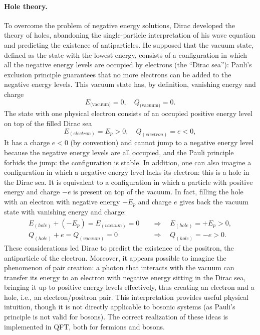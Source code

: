 \paragraph{Hole theory.}
To overcome the problem of negative energy solutions, Dirac developed the theory of holes, abandoning the single-particle interpretation of his wave equation and predicting the existence of antiparticles. He supposed that the vacuum state, defined as the state with the lowest energy, consists of a configuration in which all the negative energy levels are occupied by electrons (the “Dirac sea”): Pauli’s exclusion principle guarantees that no more electrons can be added to the negative energy levels. This vacuum state has, by definition, vanishing energy and charge
\[
    E_{\text{(vacuum)}} = 0, \quad Q_{\text{(vacuum)}} = 0.
\]
The state with one physical electron consists of an occupied positive energy level on top of the filled Dirac sea
\[
    E_{(electron)} = E_p > 0, \quad Q_{(electron)} = e < 0,
\]
It has a charge \(e<0\) (by convention) and cannot jump to a negative energy level because the negative energy levels are all occupied, and the Pauli principle forbids the jump: the configuration is stable. In addition, one can also imagine a configuration in which a negative energy level lacks its electron: this is a hole in the Dirac sea. It is equivalent to a configuration in which a particle with positive energy and charge \(-e\) is present on top of the vacuum. In fact, filling the hole with an electron with negative energy \(-E_p\) and charge \(e\) gives back the vacuum state with vanishing energy and charge:
\[
    \begin{aligned}
        E_{(hole)} + (-E_p) = E_{(vacuum)} = 0 \quad & \Longrightarrow \quad E_{(hole)} = +E_p > 0, \\
        Q_{(hole)} + e = Q_{(vacuum)} = 0 \quad      & \Longrightarrow \quad Q_{(hole)} = -e > 0.
    \end{aligned}
\]
These considerations led Dirac to predict the existence of the positron, the antiparticle of the electron. Moreover, it appears possible to imagine the phenomenon of pair creation: a photon that interacts with the vacuum can transfer its energy to an electron with negative energy sitting in the Dirac sea, bringing it up to positive energy levels effectively, thus creating an electron and a hole, i.e., an electron/positron pair.
This interpretation provides useful physical intuition, though it is not directly applicable to bosonic systems (as Pauli’s principle is not valid for bosons). The correct realization of these ideas is implemented in QFT, both for fermions and bosons.

